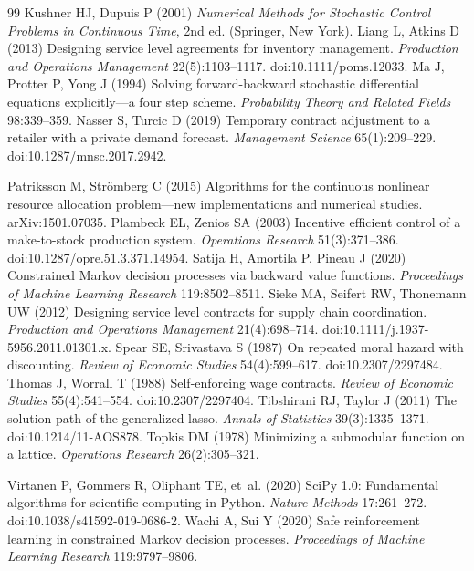 \documentclass[11pt,letterpaper]{article}
\theoremstyle{definition}
\newcommand{\1}{\mathbf 1}
\begin{document}
\begin{thebibliography}{99}
Kushner HJ, Dupuis P (2001) \emph{Numerical Methods for Stochastic Control Problems in Continuous Time}, 2nd ed. (Springer, New York).
Liang L, Atkins D (2013) Designing service level agreements for inventory management. \emph{Production and Operations Management} 22(5):1103--1117. doi:10.1111/poms.12033.
Ma J, Protter P, Yong J (1994) Solving forward-backward stochastic differential equations explicitly---a four step scheme. \emph{Probability Theory and Related Fields} 98:339--359.
Nasser S, Turcic D (2019) Temporary contract adjustment to a retailer with a private demand forecast. \emph{Management Science} 65(1):209--229. doi:10.1287/mnsc.2017.2942.

Patriksson M, Str\"omberg C (2015) Algorithms for the continuous nonlinear resource allocation problem---new implementations and numerical studies. arXiv:1501.07035.
Plambeck EL, Zenios SA (2003) Incentive efficient control of a make-to-stock production system. \emph{Operations Research} 51(3):371--386. doi:10.1287/opre.51.3.371.14954.
Satija H, Amortila P, Pineau J (2020) Constrained Markov decision processes via backward value functions. \emph{Proceedings of Machine Learning Research} 119:8502--8511.
Sieke MA, Seifert RW, Thonemann UW (2012) Designing service level contracts for supply chain coordination. \emph{Production and Operations Management} 21(4):698--714. doi:10.1111/j.1937-5956.2011.01301.x.
Spear SE, Srivastava S (1987) On repeated moral hazard with discounting. \emph{Review of Economic Studies} 54(4):599--617. doi:10.2307/2297484.
Thomas J, Worrall T (1988) Self-enforcing wage contracts. \emph{Review of Economic Studies} 55(4):541--554. doi:10.2307/2297404.
Tibshirani RJ, Taylor J (2011) The solution path of the generalized lasso. \emph{Annals of Statistics} 39(3):1335--1371. doi:10.1214/11-AOS878.
Topkis DM (1978) Minimizing a submodular function on a lattice. \emph{Operations Research} 26(2):305--321.


Virtanen P, Gommers R, Oliphant TE, et~al. (2020) SciPy 1.0: Fundamental algorithms for scientific computing in Python. \emph{Nature Methods} 17:261--272. doi:10.1038/s41592-019-0686-2.
Wachi A, Sui Y (2020) Safe reinforcement learning in constrained Markov decision processes. \emph{Proceedings of Machine Learning Research} 119:9797--9806.

\end{thebibliography}

\end{document}
